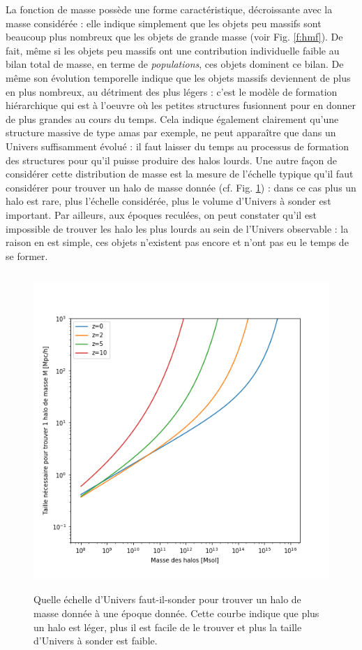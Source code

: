 La fonction de masse possède une forme caractéristique, décroissante avec la masse considérée : elle indique simplement que les objets peu massifs sont beaucoup plus nombreux que les objets de grande masse (voir Fig. \ref{f:hmf}). De fait, même si les objets peu massifs ont une contribution individuelle faible au bilan total de masse, en terme de \textit{populations}, ces objets dominent ce bilan. De même son évolution temporelle indique que les objets massifs deviennent de plus en plus nombreux, au détriment des plus légers : c'est le modèle de formation hiérarchique qui est à l'oeuvre où les petites structures fusionnent pour en donner de plus grandes au cours du temps. Cela indique également clairement qu'une structure massive de type amas par exemple, ne peut apparaître que dans un Univers suffisamment évolué : il faut laisser du temps au processus de formation des structures pour qu'il puisse produire des halos lourds. Une autre façon de considérer cette distribution de masse est la mesure de l'échelle typique qu'il faut considérer pour trouver un halo de masse donnée (cf. Fig. \ref{f:L}) : dans ce cas plus un halo est rare, plus l'échelle considérée, plus le volume d'Univers à sonder est important. Par ailleurs, aux époques reculées, on peut constater qu'il est impossible de trouver les halo les plus lourds au sein de l'Univers observable : la raison en est simple, ces objets n'existent pas encore et n'ont pas eu le temps de se former.

\begin{figure}[htbp]
	\centering
		\includegraphics[height=12cm]{figs/L.png}
	\caption[Quelle échelle d'Univers faut-il-sonder pour trouver un halo de masse donnée à une époque donnée]{Quelle échelle d'Univers faut-il-sonder pour trouver un halo de masse donnée à une époque donnée. Cette courbe indique que plus un halo est léger, plus il est facile de le trouver et plus la taille d'Univers à sonder est faible.} 
	\label{f:L}
\end{figure}

